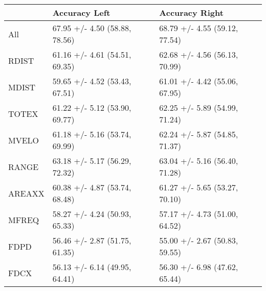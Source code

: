 \begin{tabular}{lll}
\toprule
{} &                  Accuracy Left &                 Accuracy Right \\
\midrule
All    &  67.95 +/- 4.50 (58.88, 78.56) &  68.79 +/- 4.55 (59.12, 77.54) \\
RDIST  &  61.16 +/- 4.61 (54.51, 69.35) &  62.68 +/- 4.56 (56.13, 70.99) \\
MDIST  &  59.65 +/- 4.52 (53.43, 67.51) &  61.01 +/- 4.42 (55.06, 67.95) \\
TOTEX  &  61.22 +/- 5.12 (53.90, 69.77) &  62.25 +/- 5.89 (54.99, 71.24) \\
MVELO  &  61.18 +/- 5.16 (53.74, 69.99) &  62.24 +/- 5.87 (54.85, 71.37) \\
RANGE  &  63.18 +/- 5.17 (56.29, 72.32) &  63.04 +/- 5.16 (56.40, 71.28) \\
AREAXX &  60.38 +/- 4.87 (53.74, 68.48) &  61.27 +/- 5.65 (53.27, 70.10) \\
MFREQ  &  58.27 +/- 4.24 (50.93, 65.33) &  57.17 +/- 4.73 (51.00, 64.52) \\
FDPD   &  56.46 +/- 2.87 (51.75, 61.35) &  55.00 +/- 2.67 (50.83, 59.55) \\
FDCX   &  56.13 +/- 6.14 (49.95, 64.41) &  56.30 +/- 6.98 (47.62, 65.44) \\
\bottomrule
\end{tabular}
